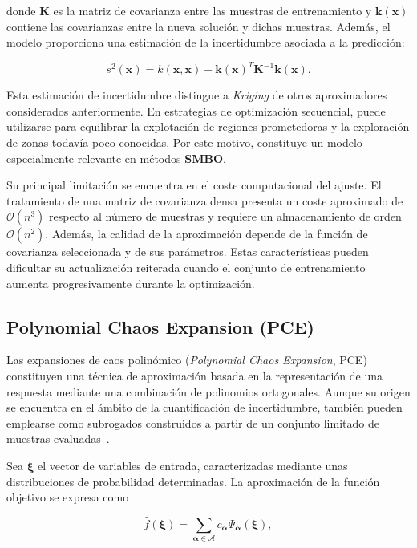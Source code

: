donde \(\mathbf{K}\) es la matriz de covarianza entre las muestras de entrenamiento y \(\mathbf{k}(\mathbf{x})\) contiene las covarianzas entre la nueva solución y dichas muestras. Además, el modelo proporciona una estimación de la incertidumbre asociada a la predicción:

\begin{equation}
    s^{2}(\mathbf{x})
    =
    k(\mathbf{x}, \mathbf{x})
    -
    \mathbf{k}(\mathbf{x})^{T}
    \mathbf{K}^{-1}
    \mathbf{k}(\mathbf{x}).
\end{equation}

Esta estimación de incertidumbre distingue a \textit{Kriging} de otros aproximadores considerados anteriormente. En estrategias de optimización secuencial, puede utilizarse para equilibrar la explotación de regiones prometedoras y la exploración de zonas todavía poco conocidas. Por este motivo, constituye un modelo especialmente relevante en métodos \textbf{SMBO}.

Su principal limitación se encuentra en el coste computacional del ajuste. El tratamiento de una matriz de covarianza densa presenta un coste aproximado de \(\mathcal{O}(n^{3})\) respecto al número de muestras y requiere un almacenamiento de orden \(\mathcal{O}(n^{2})\). Además, la calidad de la aproximación depende de la función de covarianza seleccionada y de sus parámetros. Estas características pueden dificultar su actualización reiterada cuando el conjunto de entrenamiento aumenta progresivamente durante la optimización.

\subsection{Polynomial Chaos Expansion (PCE)}

Las expansiones de caos polinómico (\textit{Polynomial Chaos Expansion}, PCE) constituyen una técnica de aproximación basada en la representación de una respuesta mediante una combinación de polinomios ortogonales. Aunque su origen se encuentra en el ámbito de la cuantificación de incertidumbre, también pueden emplearse como subrogados construidos a partir de un conjunto limitado de muestras evaluadas~\cite{xiu2002wiener}.

Sea \(\boldsymbol{\xi}\) el vector de variables de entrada, caracterizadas mediante unas distribuciones de probabilidad determinadas. La aproximación de la función objetivo se expresa como

\begin{equation}
    \hat{f}(\boldsymbol{\xi})
    =
    \sum_{\boldsymbol{\alpha} \in \mathcal{A}}
    c_{\boldsymbol{\alpha}}
    \Psi_{\boldsymbol{\alpha}}(\boldsymbol{\xi}),
\end{equation}

